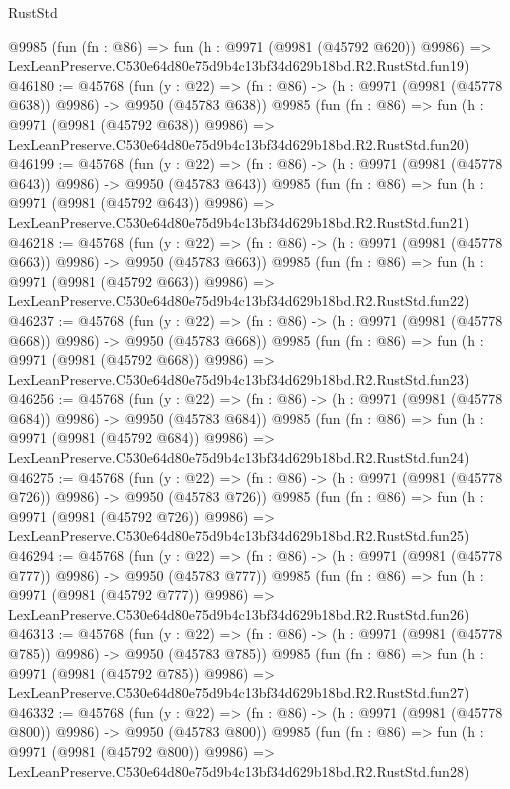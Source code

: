 \begin{lexlean}{RustStd}
\begin{coremodule}
    @9985
    (fun (fn : @86) =>
    fun (h : @9971 (@9981 (@45792 @620)) @9986) =>
    LexLeanPreserve.C530e64d80e75d9b4c13bf34d629b18bd.R2.RustStd.fun19)
@46180 := @45768
    (fun (y : @22) => (fn : @86) -> (h : @9971 (@9981 (@45778 @638)) @9986) -> @9950 (@45783 @638))
    @9985
    (fun (fn : @86) =>
    fun (h : @9971 (@9981 (@45792 @638)) @9986) =>
    LexLeanPreserve.C530e64d80e75d9b4c13bf34d629b18bd.R2.RustStd.fun20)
@46199 := @45768
    (fun (y : @22) => (fn : @86) -> (h : @9971 (@9981 (@45778 @643)) @9986) -> @9950 (@45783 @643))
    @9985
    (fun (fn : @86) =>
    fun (h : @9971 (@9981 (@45792 @643)) @9986) =>
    LexLeanPreserve.C530e64d80e75d9b4c13bf34d629b18bd.R2.RustStd.fun21)
@46218 := @45768
    (fun (y : @22) => (fn : @86) -> (h : @9971 (@9981 (@45778 @663)) @9986) -> @9950 (@45783 @663))
    @9985
    (fun (fn : @86) =>
    fun (h : @9971 (@9981 (@45792 @663)) @9986) =>
    LexLeanPreserve.C530e64d80e75d9b4c13bf34d629b18bd.R2.RustStd.fun22)
@46237 := @45768
    (fun (y : @22) => (fn : @86) -> (h : @9971 (@9981 (@45778 @668)) @9986) -> @9950 (@45783 @668))
    @9985
    (fun (fn : @86) =>
    fun (h : @9971 (@9981 (@45792 @668)) @9986) =>
    LexLeanPreserve.C530e64d80e75d9b4c13bf34d629b18bd.R2.RustStd.fun23)
@46256 := @45768
    (fun (y : @22) => (fn : @86) -> (h : @9971 (@9981 (@45778 @684)) @9986) -> @9950 (@45783 @684))
    @9985
    (fun (fn : @86) =>
    fun (h : @9971 (@9981 (@45792 @684)) @9986) =>
    LexLeanPreserve.C530e64d80e75d9b4c13bf34d629b18bd.R2.RustStd.fun24)
@46275 := @45768
    (fun (y : @22) => (fn : @86) -> (h : @9971 (@9981 (@45778 @726)) @9986) -> @9950 (@45783 @726))
    @9985
    (fun (fn : @86) =>
    fun (h : @9971 (@9981 (@45792 @726)) @9986) =>
    LexLeanPreserve.C530e64d80e75d9b4c13bf34d629b18bd.R2.RustStd.fun25)
@46294 := @45768
    (fun (y : @22) => (fn : @86) -> (h : @9971 (@9981 (@45778 @777)) @9986) -> @9950 (@45783 @777))
    @9985
    (fun (fn : @86) =>
    fun (h : @9971 (@9981 (@45792 @777)) @9986) =>
    LexLeanPreserve.C530e64d80e75d9b4c13bf34d629b18bd.R2.RustStd.fun26)
@46313 := @45768
    (fun (y : @22) => (fn : @86) -> (h : @9971 (@9981 (@45778 @785)) @9986) -> @9950 (@45783 @785))
    @9985
    (fun (fn : @86) =>
    fun (h : @9971 (@9981 (@45792 @785)) @9986) =>
    LexLeanPreserve.C530e64d80e75d9b4c13bf34d629b18bd.R2.RustStd.fun27)
@46332 := @45768
    (fun (y : @22) => (fn : @86) -> (h : @9971 (@9981 (@45778 @800)) @9986) -> @9950 (@45783 @800))
    @9985
    (fun (fn : @86) =>
    fun (h : @9971 (@9981 (@45792 @800)) @9986) =>
    LexLeanPreserve.C530e64d80e75d9b4c13bf34d629b18bd.R2.RustStd.fun28)

\end{coremodule}
\end{lexlean}
